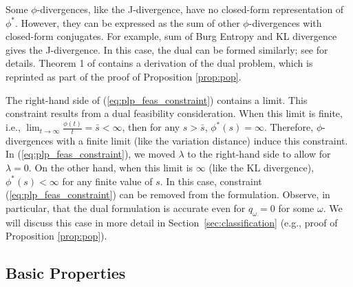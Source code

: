 \documentclass[opre,nonblindrev]{informs3} %
\begin{document}
Some $\phi$-divergences, like the J-divergence, have no closed-form representation of $\phi^*$. 
However, they can be expressed as the sum of other $\phi$-divergences with closed-form conjugates. 
For example, sum of Burg Entropy and KL divergence gives the J-divergence. 
In this case, the dual can be formed similarly; see \cite{bental2013robust} for details.
Theorem 1 of \cite{bental2013robust} contains a derivation of the dual problem, which is reprinted as part of the proof of Proposition \ref{prop:pop}.


The right-hand side of (\ref{eq:plp_feas_constraint}) contains a limit.
This constraint results from a dual feasibility consideration. 
When this limit is finite, i.e., $\lim_{t \rightarrow \infty} \frac{\phi(t)}{t}=  \bar{s}<\infty$, then for any $s> \bar{s}$, $\phi^*(s)=\infty$. 
Therefore, $\phi$-divergences with a finite limit (like the variation distance) induce this constraint.
In (\ref{eq:plp_feas_constraint}), we moved $\lambda$ to the right-hand side to allow for $\lambda=0$. 
On the other hand, when this limit is $\infty$ (like the KL divergence), $\phi^*(s)<\infty$ for any finite value of $s$. 
In this case, 
constraint (\ref{eq:plp_feas_constraint}) can be removed from the formulation. 
Observe, in particular, that the dual formulation is accurate even for $q_\omega = 0$ for some $\omega$.  
We will discuss this case in more detail in Section~\ref{sec:classification} (e.g., proof of  Proposition \ref{prop:pop}).



\subsection{Basic Properties}
\label{ssec:basicprop}
\end{document}

